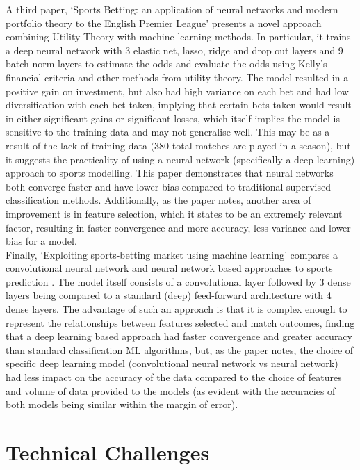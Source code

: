 \documentclass[10pt,twocolumn,letterpaper]{article}
\begin{document}
A third paper, `Sports Betting: an application of neural networks
and modern portfolio theory to the English Premier
League' \cite{Jiménez} presents a novel approach combining Utility Theory with machine learning methods. In particular, it trains a deep neural network with $3$ elastic net, lasso, ridge and drop out layers and $9$ batch norm layers to estimate the odds and evaluate the odds using Kelly’s financial criteria and other methods from utility theory. The model resulted in a positive gain on investment, but also had high variance on each bet and had low diversification with each bet taken, implying that certain bets taken would result in either significant gains or significant losses, which itself implies the model is sensitive to the training data and may not generalise well. This may be as a result of the lack of training data $(380$ total matches are played in a season), but it suggests the practicality of using a neural network (specifically a deep learning) approach to sports modelling. This paper demonstrates that neural networks both converge faster and have lower bias compared to traditional supervised classification methods. Additionally, as the paper notes, another area of improvement is in feature selection, which it states to be an extremely relevant factor, resulting in faster convergence and more accuracy, less variance and lower bias for a model. \\

Finally, `Exploiting sports-betting market using machine learning' compares a convolutional neural network and neural network based approaches to sports prediction \cite{Hubáček}. The model itself consists of a convolutional layer followed by $3$ dense layers being compared to a standard (deep) feed-forward architecture with 4 dense layers. The advantage of such an approach is that it is complex enough to represent the relationships between features selected and match outcomes, finding that a deep learning based approach had faster convergence and greater accuracy than standard classification ML algorithms, but, as the paper notes, the choice of specific deep learning model (convolutional neural network vs neural network) had less impact on the accuracy of the data compared to the choice of features and volume of data provided to the models (as evident with the accuracies of both models being similar within the margin of error). 

\section{Technical Challenges}
\end{document}
